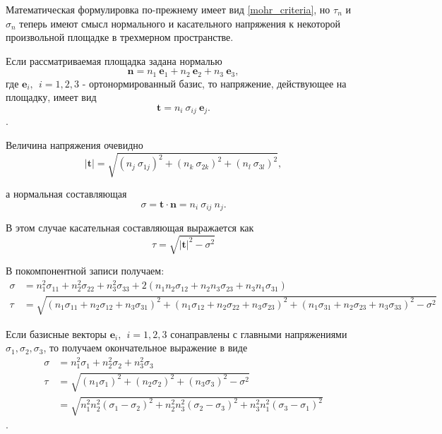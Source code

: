Математическая формулировка по-прежнему имеет вид \ref{mohr_criteria}, но $\tau_n$ и $\sigma_n$ теперь имеют смысл нормального и касательного напряжения к некоторой произвольной площадке в трехмерном пространстве.

Если рассматриваемая площадка задана нормалью
\begin{equation}
\mathbf{n} = n_1~\mathbf{e}_1 + n_2~\mathbf{e}_2 + n_3~\mathbf{e}_3,
\end{equation}
где $\mathbf{e}_i,~~ i=1,2,3$ - ортонормированный базис, то напряжение, действующее на площадку, имеет вид
\begin{equation}
\mathbf{t} = n_i~\sigma_{ij}~\mathbf{e}_j.
\end{equation}.

Величина напряжения очевидно
\begin{equation}
|\mathbf{t}| = \sqrt{ (n_j~\sigma_{1j})^2 + (n_k~\sigma_{2k})^2 + (n_l~\sigma_{3l})^2},
\end{equation}

а нормальная составляющая
\begin{equation}
\sigma = \mathbf{t}\cdot\mathbf{n} = n_i~\sigma_{ij}~n_j.
\end{equation}

В этом случае касательная составляющая выражается как
\begin{equation}
\tau = \sqrt{|\mathbf{t}|^2 - \sigma^2}
\end{equation}

В покомпонентной записи получаем:
\begin{eqnarray}
\sigma & = n_1^2 \sigma_{11} + n_2^2 \sigma_{22} + n_3^2 \sigma_{33} + 
	2(n_1 n_2 \sigma_{12} + n_2 n_3 \sigma_{23} + n_3 n_1 \sigma_{31}) \\
	\tau & = \sqrt{(n_1\sigma_{11} + n_2\sigma_{12} + n_3\sigma_{31})^2 +
	(n_1\sigma_{12} + n_2\sigma_{22} + n_3\sigma_{23})^2 + 
	(n_1\sigma_{31} + n_2\sigma_{23} + n_3\sigma_{33})^2 - \sigma^2}
\end{eqnarray}

Если базисные векторы $\mathbf{e}_i,~~ i=1,2,3$ сонаправлены с главными напряжениями $\sigma_1, \sigma_2, \sigma_3$, то получаем окончательное выражение в виде
\begin{eqnarray}
    \sigma & = n_1^2 \sigma_{1} + n_2^2 \sigma_{2} + n_3^2 \sigma_{3} \\
    \tau & = \sqrt{(n_1\sigma_{1})^2 + (n_2\sigma_{2})^2 + (n_3\sigma_{3})^2 - \sigma^2} \\
         & = \sqrt{n_1^2 n_2^2 (\sigma_1-\sigma_2)^2 + n_2^2 n_3^2 (\sigma_2-\sigma_3)^2 + 
                   n_3^2 n_1^2 (\sigma_3 - \sigma_1)^2}
\end{eqnarray}.


